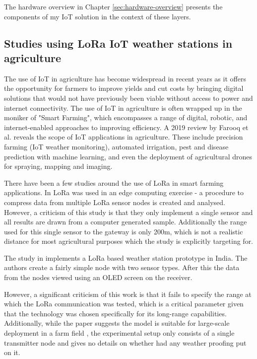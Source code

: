 The hardware overview in Chapter \ref{sec:hardware-overview} presents the
components of my IoT solution in the context of these layers.

\subsection{Studies using LoRa IoT weather stations in agriculture}

The use of IoT in agriculture has become widespread in recent years as it offers
the opportunity for farmers to improve yields and cut costs by bringing digital
solutions that would not have previously been viable without access to power and
internet connectivity. The use of IoT in agriculture is often wrapped up in the
moniker of "Smart Farming", which encompasses a range of digital, robotic, and
internet-enabled approaches to improving efficiency. A 2019 review by Farooq et
al. \cite{farooq2019iot} reveals the scope of IoT applications in agriculture.
These include precision farming (IoT weather monitoring), automated irrigation,
pest and disease prediction with machine learning, and even the deployment of
agricultural drones for spraying, mapping and imaging. 

There have been a few studies around the use of LoRa in smart farming
applications. In \cite{edgeAiGiaEtAl} LoRa was used in an edge computing
exercise - a procedure to compress data from multiple LoRa sensor nodes is
created and analysed. However, a criticism of this study is that they only
implement a single sensor and all results are drawn from a computer generated
sample. Additionally the range used for this single sensor to the gateway is
only 200m, which is not a realistic distance for most agricultural purposes
which the study is explicitly targeting for.

The study in \cite{smartFarmKodaliEtAl} implements a LoRa based weather station
prototype in India. The authors create a fairly simple node with two sensor
types. After this the data from the nodes viewed using an OLED screen on the
receiver.

However, a significant criticism of this work is that it fails to specify the
range at which the LoRa communication was tested, which is a critical parameter
given that the technology was chosen specifically for its long-range
capabilities. Additionally, while the paper suggests the model is suitable for
large-scale deployment in a farm field , the experimental setup only consists of
a single transmitter node and gives no details on whether had any weather
proofing put on it.

